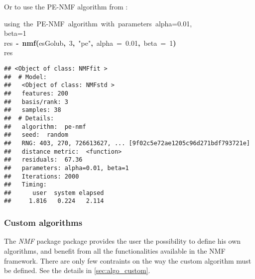 \documentclass[a4paper]{article}\usepackage{graphicx, color}
\makeatletter
\newcommand{\hlnumber}[1]{\textcolor[rgb]{0,0,0}{#1}}%
\newcommand{\hlfunctioncall}[1]{\textcolor[rgb]{0.501960784313725,0,0.329411764705882}{\textbf{#1}}}%
\newcommand{\hlstring}[1]{\textcolor[rgb]{0.6,0.6,1}{#1}}%
\newcommand{\hlkeyword}[1]{\textcolor[rgb]{0,0,0}{\textbf{#1}}}%
\newcommand{\hlargument}[1]{\textcolor[rgb]{0.690196078431373,0.250980392156863,0.0196078431372549}{#1}}%
\newcommand{\hlcomment}[1]{\textcolor[rgb]{0.180392156862745,0.6,0.341176470588235}{#1}}%
\newcommand{\hlassignement}[1]{\textcolor[rgb]{0,0,0}{\textbf{#1}}}%
\newcommand{\hlsymbol}[1]{\textcolor[rgb]{0,0,0}{#1}}%
\newcommand{\hlstd}[1]{\textcolor[rgb]{0,0,0}{#1}}%
\newenvironment{kframe}{%
 \def\FrameCommand##1{\hskip\@totalleftmargin \hskip-\fboxsep
 \colorbox{shadecolor}{##1}\hskip-\fboxsep
     \hskip-\linewidth \hskip-\@totalleftmargin \hskip\columnwidth}%
 \MakeFramed {\advance\hsize-\width
   \@totalleftmargin\z@ \linewidth\hsize
   \@setminipage}}%
 {\par\unskip\endMakeFramed}
\newenvironment{knitrout}{}{} %
\let\code=\texttt
\newcommand{\pkgname}[1]{\textit{#1}\xspace}
\newcommand{\Rpkg}[1]{\pkgname{#1} package\xspace}
\newcommand{\nmfpack}{\Rpkg{NMF}}
\makeatother
\begin{document}
Or to use the PE-NMF algorithm from \cite{Zhang2008}:
\begin{knitrout}
\color{fgcolor}\begin{kframe}
\begin{flushleft}
\ttfamily\noindent
\hlcomment{\usebox{\hlnormalsizeboxhash}{\ }using{\ }the{\ }PE-NMF{\ }algorithm{\ }with{\ }parameters{\ }alpha=0.01,}\hspace*{\fill}\\
\hlstd{}\hlcomment{\usebox{\hlnormalsizeboxhash}{\ }beta=1}\hspace*{\fill}\\
\hlstd{}\hlsymbol{res}{\ }\hlassignement{\usebox{\hlnormalsizeboxlessthan}-}{\ }\hlfunctioncall{nmf}\hlkeyword{(}\hlsymbol{esGolub}\hlkeyword{,}{\ }\hlnumber{3}\hlkeyword{,}{\ }\hlstring{"{}pe"{}}\hlkeyword{,}{\ }\hlargument{alpha}{\ }\hlargument{=}{\ }\hlnumber{0.01}\hlkeyword{,}{\ }\hlargument{beta}{\ }\hlargument{=}{\ }\hlnumber{1}\hlkeyword{)}\hspace*{\fill}\\
\hlstd{}\hlsymbol{res}\mbox{}
\normalfont
\end{flushleft}
\begin{verbatim}
## <Object of class: NMFfit >
##  # Model:
##   <Object of class: NMFstd >
##   features: 200 
##   basis/rank: 3 
##   samples: 38 
##  # Details:
##   algorithm:  pe-nmf 
##   seed:  random 
##   RNG: 403, 270, 726613627, ... [9f02c5e72ae1205c96d271bdf793721e]
##   distance metric:  <function> 
##   residuals:  67.36 
##   parameters: alpha=0.01, beta=1 
##   Iterations: 2000 
##   Timing:
##      user  system elapsed 
##     1.816   0.224   2.114 
\end{verbatim}
\end{kframe}
\end{knitrout}


%
%
%


\subsubsection{Custom algorithms}
The \nmfpack package provides the user the possibility to define his own algorithms, and benefit from all the functionalities available in the NMF framework.
There are only few contraints on the way the custom algorithm must be defined.
See the details in \cref{sec:algo_custom}.
\end{document}
